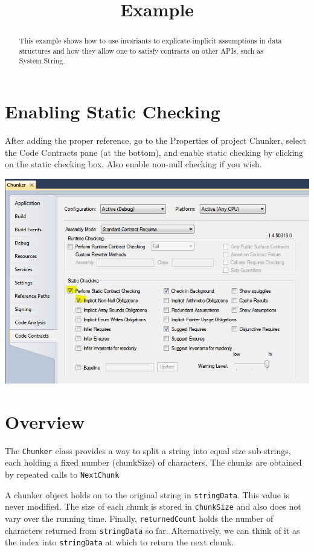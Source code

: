 \documentclass{article}
\title{\ProjectName{} Example}
\date{}
\newcommand{\ProjectName}{Chunker}
\newcommand{\code}[1]{\lstinline{#1}}
\begin{document}
\maketitle
\begin{abstract}
This example shows how to use invariants to explicate implicit
assumptions in data structures and how they allow one to satisfy
contracts on other APIs, such as System.String.
\end{abstract}



\section{Enabling Static Checking}
\label{sec:start}

After adding the proper reference, go to the Properties of project
\textsf{\ProjectName}, select the Code Contracts pane (at the bottom), and enable static
checking by clicking on the static checking box. Also enable non-null
checking if you wish.
\begin{center}
  \includegraphics[width=.8\columnwidth]{pane.png}
\end{center}

\section{Overview}
The \code{Chunker} class provides a way to split a string into equal size
sub-strings, each holding a fixed number (chunkSize) of
characters. The chunks are obtained by repeated calls to \code{NextChunk}

A chunker object holds on to the original string in
\code{stringData}. This value is never modified. The size of each
chunk is stored in \code{chunkSize} and also does not vary over the
running time. Finally, \code{returnedCount} holds the number of
characters returned from \code{stringData} so far. Alternatively, we
can think of it as the index into \code{stringData} at which to return
the next chunk.
\end{document}
